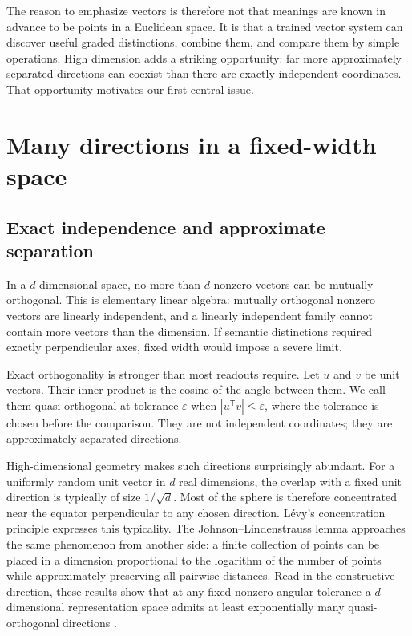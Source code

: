 \documentclass[
  aps,
  reprint,
  superscriptaddress,
  floatfix,
  nofootinbib,
  longbibliography
]{revtex4-2}
\newcommand{\T}{^{\mathsf T}}
\begin{document}
The reason to emphasize vectors is therefore not that meanings are known in
advance to be points in a Euclidean space.  It is that a trained vector system
can discover useful graded distinctions, combine them, and compare them by
simple operations.  High dimension adds a striking opportunity: far more
approximately separated directions can coexist than there are exactly
independent coordinates.  That opportunity motivates our first central
issue.

\section{Many directions in a fixed-width space}
\label{sec:quasi}

\subsection{Exact independence and approximate separation}

In a $d$-dimensional space, no more than $d$ nonzero vectors can be mutually
orthogonal.  This is elementary linear algebra: mutually orthogonal nonzero
vectors are linearly independent, and a linearly independent family cannot
contain more vectors than the dimension.  If semantic distinctions required
exactly perpendicular axes, fixed width would impose a severe limit.

Exact orthogonality is stronger than most readouts require.  Let $u$ and $v$
be unit vectors.  Their inner product is the cosine of the angle between them.
We call them quasi-orthogonal at tolerance $\varepsilon$ when
$|u\T v|\leq\varepsilon$, where the tolerance is chosen before the comparison.
They are not independent coordinates; they are approximately separated
directions.

High-dimensional geometry makes such directions surprisingly abundant.
For a uniformly random unit vector in $d$ real dimensions, the overlap with a
fixed unit direction is typically of size $1/\sqrt d$.  Most of the sphere is
therefore concentrated near the equator perpendicular to any chosen
direction.  L\'evy's concentration principle expresses this typicality.
The Johnson--Lindenstrauss lemma approaches the same phenomenon from another
side: a finite collection of points can be placed in a dimension proportional
to the logarithm of the number of points while approximately preserving all
pairwise distances.  Read in the constructive direction, these results show
that at any fixed nonzero angular tolerance a $d$-dimensional representation
space admits
at least exponentially many quasi-orthogonal directions
\cite{ledoux2001concentration,johnson-1984,Dasgupta-2003}.
\end{document}
